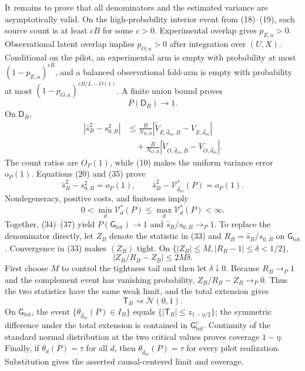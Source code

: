 It remains to prove that all denominators and the estimated variance are asymptotically valid.  On the high-probability interior event from (18)--(19), each source count is at least \(cB\) for some \(c>0\).  Experimental overlap gives \(p_{E,a}>0\).  Observational latent overlap implies \(p_{O,a}>0\) after integration over \((U,X)\).  Conditional on the pilot, an experimental arm is empty with probability at most \((1-p_{E,a})^{cB}\), and a balanced observational fold-arm is empty with probability at most \((1-p_{O,a})^{cB/L-O(1)}\).  A finite union bound proves
\[
P(\mathsf D_B)\to1.                                                \tag{34}
\]
On \(\mathsf D_B\),
\[
\begin{aligned}
|\widehat s_B^2-s_{0,B}^2|
&\le\frac{B}{N_{E,B}}
|\widetilde V_{E,\widehat d_m,B}-V_{E,\widehat d_m}|\\
&\quad+\frac{B}{N_{O,B}}
|\widetilde V_{O,\widehat d_m,B}-V_{O,\widehat d_m}|.
\end{aligned}                                                       \tag{35}
\]
The count ratios are \(O_P(1)\), while (10) makes the uniform variance error \(o_P(1)\).  Equations (20) and (35) prove
\[
\widehat s_B^2-s_{0,B}^2=o_P(1),\qquad
\widehat s_B^2-\mathcal V_{\widehat d_m}^*(P)=o_P(1).              \tag{36}
\]
Nondegeneracy, positive costs, and finiteness imply
\[
0<\min_d\mathcal V_d^*(P)\le\max_d\mathcal V_d^*(P)<\infty.     \tag{37}
\]
Together, (34)--(37) yield \(P(\mathsf G_{\mathrm{tot}})\to1\) and \(\widehat s_B/s_{0,B}\to_P1\).  To replace the denominator directly, let \(Z_B\) denote the statistic in (33) and \(R_B=\widehat s_B/s_{0,B}\) on \(\mathsf G_{\mathrm{tot}}\).  Convergence in (33) makes \((Z_B)\) tight.  On \(\{|Z_B|\le M,|R_B-1|\le\delta<1/2\}\),
\[
|Z_B/R_B-Z_B|\le2M\delta.
\]
First choose \(M\) to control the tightness tail and then let \(\delta\downarrow0\).  Because \(R_B\to_P1\) and the complement event has vanishing probability, \(Z_B/R_B-Z_B\to_P0\).  Thus the two statistics have the same weak limit, and the total extension gives
\[
\mathsf T_B\rightsquigarrow\mathcal N(0,1).
\]
On \(\mathsf G_{\mathrm{tot}}\), the event \(\{\theta_{\widehat d_m}(P)\in I_B\}\) equals \(\{|\mathsf T_B|\le z_{1-\eta/2}\}\); the symmetric difference under the total extension is contained in \(\mathsf G_{\mathrm{tot}}^c\).  Continuity of the standard normal distribution at the two critical values proves coverage \(1-\eta\).  Finally, if \(\theta_d(P)=\tau\) for all \(d\), then \(\theta_{\widehat d_m}(P)=\tau\) for every pilot realization.  Substitution gives the asserted causal-centered limit and coverage.